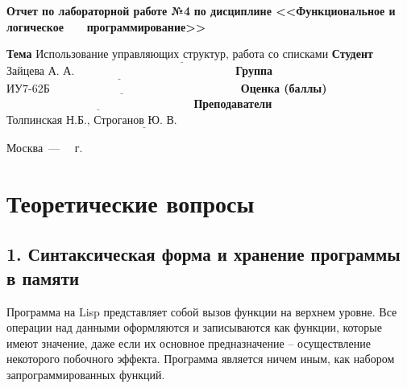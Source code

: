 \documentclass[12pt]{report}
\begin{document}
\begin{titlepage}
		\begin{center}
			\noindent\begin{minipage}{1.1\textwidth}\centering
				\Large\textbf{  Отчет по лабораторной работе №4}\newline
				\textbf{по дисциплине <<Функциональное и логическое}\newline
				\textbf{~~~программирование>>}\newline\newline
			\end{minipage}
		\end{center}
		
		\noindent\textbf{Тема} $\underline{\text{Использование управляющих структур, работа со списками}}$\newline\newline
		\noindent\textbf{Студент} $\underline{\text{Зайцева А. А.~~~~~~~~~~~~~~~~~~~~~~~~~~~~~~~~~~~~~~~~~~}}$\newline\newline
		\noindent\textbf{Группа} $\underline{\text{ИУ7-62Б~~~~~~~~~~~~~~~~~~~~~~~~~~~~~~~~~~~~~~~~~~~~~~~~~~}}$\newline\newline
		\noindent\textbf{Оценка (баллы)} $\underline{\text{~~~~~~~~~~~~~~~~~~~~~~~~~~~~~~~~~~~~~~~~~~~~~~~~~}}$\newline\newline
		\noindent\textbf{Преподаватели} $\underline{\text{Толпинская Н.Б., Строганов Ю. В.~~~~~~~~~~~~~~~~~~~~~~~~~~~~}}$\newline\newline\newline
		
		\begin{center}
			\vfill
			Москва~---~\the\year
			~г.
		\end{center}
	\end{titlepage}
	
\chapter*{Теоретические вопросы}

\section*{1. Синтаксическая форма и хранение программы в памяти}

Программа на Lisp представляет собой вызов функции на верхнем уровне. Все операции над данными оформляются и  записываются как функции, которые имеют значение, даже если их основное предназначение – осуществление некоторого побочного эффекта. Программа является ничем иным, как набором запрограммированных функций.
\end{document}
